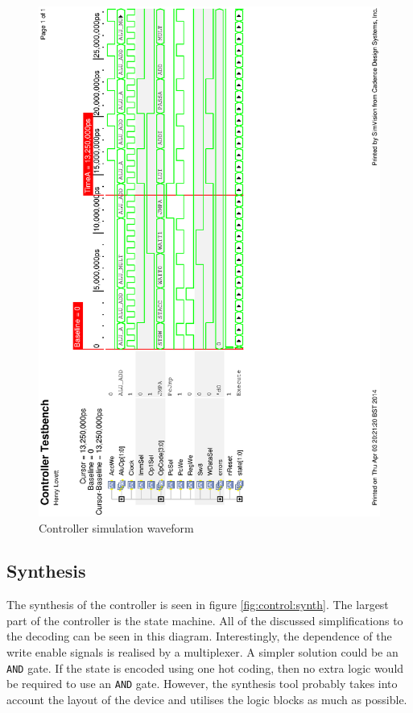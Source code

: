 \begin{figure}
\includegraphics[height=\textheight-1cm]{Figures/controllersim.eps}
\caption{Controller simulation waveform}
\label{fig:controllersim}
\end{figure}


\subsection{Synthesis}


The synthesis of the controller is seen in figure \ref{fig:control:synth}.
The largest part of the controller is the state machine. 
All of the discussed simplifications to the decoding can be seen in this diagram.
Interestingly, the dependence of the write enable signals is realised by a multiplexer.
A simpler solution could be an \texttt{AND} gate. 
If the state is encoded using one hot coding, then no extra logic would be required to use an \texttt{AND} gate.
However, the synthesis tool probably takes into account the layout of the device and utilises the logic blocks as much as possible.


